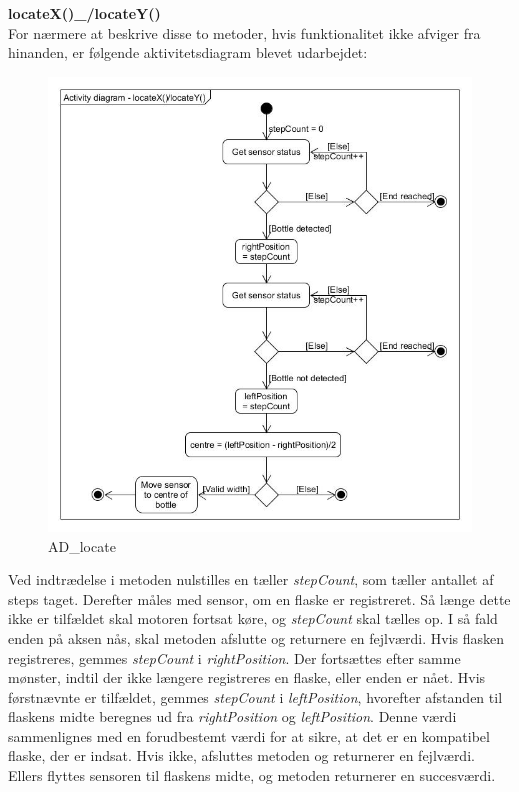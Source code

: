 \textbf{locateX()_/locateY()} \\
For nærmere at beskrive disse to metoder, hvis funktionalitet ikke afviger fra hinanden, er følgende aktivitetsdiagram blevet udarbejdet: \\

\begin{figure}[H]
	\caption{AD_locate}
	\label{locateX()_/locateY()}
	\includegraphics[scale=0.09]{AD_locate.jpg}
\end{figure}

Ved indtrædelse i metoden nulstilles en tæller \textit{stepCount}, som tæller antallet af steps taget. Derefter måles med sensor, om en flaske er registreret. Så længe dette ikke er tilfældet skal motoren fortsat køre, og \textit{stepCount} skal tælles op. I så fald enden på aksen nås, skal metoden afslutte og returnere en fejlværdi. Hvis flasken registreres, gemmes \textit{stepCount} i \textit{rightPosition}. Der fortsættes efter samme mønster, indtil der ikke længere registreres en flaske, eller enden er nået. Hvis førstnævnte er tilfældet, gemmes \textit{stepCount} i \textit{leftPosition}, hvorefter afstanden til flaskens midte beregnes ud fra \textit{rightPosition} og \textit{leftPosition}. Denne værdi sammenlignes med en forudbestemt værdi for at sikre, at det er en kompatibel flaske, der er indsat. Hvis ikke, afsluttes metoden og returnerer en fejlværdi. Ellers flyttes sensoren til flaskens midte, og metoden returnerer en succesværdi.

